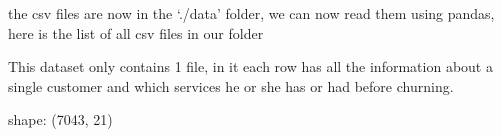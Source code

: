 \documentclass[letterpaper,10pt,english]{jupyterBook}
\begin{document}
\sphinxAtStartPar
the csv files are now in the ‘./data’ folder, we can now read them using pandas, here is the list of all csv files in our folder

\begin{sphinxVerbatim}[commandchars=\\\{\}]
\end{sphinxVerbatim}

\begin{sphinxVerbatim}
\end{sphinxVerbatim}

\sphinxAtStartPar
This dataset only contains 1 file, in it each row has all the information about a single customer and which services he or she has or had before churning.

\begin{sphinxVerbatim}[commandchars=\\\{\}]
  
  
\end{sphinxVerbatim}

\begin{sphinxVerbatim}[commandchars=\\\{\}]
shape: (7043, 21)
\end{sphinxVerbatim}
\end{document}
